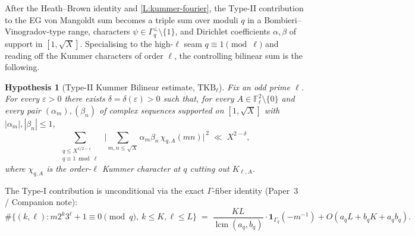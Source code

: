 \documentclass[11pt]{article}
\newtheorem{hypothesis}{Hypothesis}
\newcommand{\F}{\mathbb F}
\newcommand{\1}{\mathbf 1}
\begin{document}
After the Heath--Brown identity and \cref{L:kummer-fourier}, the Type-II contribution to the EG von Mangoldt sum becomes a triple sum over moduli \(q\) in a Bombieri--Vinogradov-type range, characters \(\psi\in\Gamma_q^\perp\setminus\{1\}\), and Dirichlet coefficients \(\alpha,\beta\) of support in \([1,\sqrt X]\).  Specialising to the high-\(\ell\) seam \(q\equiv 1\pmod\ell\) and reading off the Kummer characters of order \(\ell\), the controlling bilinear sum is the following.

\begin{hypothesis}[Type-II Kummer Bilinear estimate, $\mathrm{TKB}_\ell$]\label{H:TKB}
Fix an odd prime \(\ell\).  For every \(\varepsilon>0\) there exists \(\delta=\delta(\varepsilon)>0\) such that, for every \(A\in\F_\ell^2\setminus\{0\}\) and every pair \((\alpha_m),(\beta_n)\) of complex sequences supported on \([1,\sqrt X]\) with \(|\alpha_m|,|\beta_n|\le 1\),
\[
\sum_{\substack{q\le X^{1/2-\varepsilon}\\q\equiv 1\bmod\ell}}\;
\Biggl|\sum_{m,n\le\sqrt X}\alpha_m\beta_n\,\chi_{q,A}(mn)\Biggr|^{\,2}
\;\ll\;
X^{2-\delta},
\]
where \(\chi_{q,A}\) is the order-\(\ell\) Kummer character at \(q\) cutting out \(K_{\ell,A}\).
\end{hypothesis}

The Type-I contribution is unconditional via the exact \(\Gamma\)-fiber identity (Paper~3 / Companion note):
\[
\#\{(k,\ell):m2^k3^\ell+1\equiv 0\pmod q,\ k\le K,\ell\le L\}
\;=\;\frac{KL}{\operatorname{lcm}(a_q,b_q)}\cdot\1_{\Gamma_q}(-m^{-1})+O(a_qL+b_qK+a_qb_q).
\]
\end{document}
